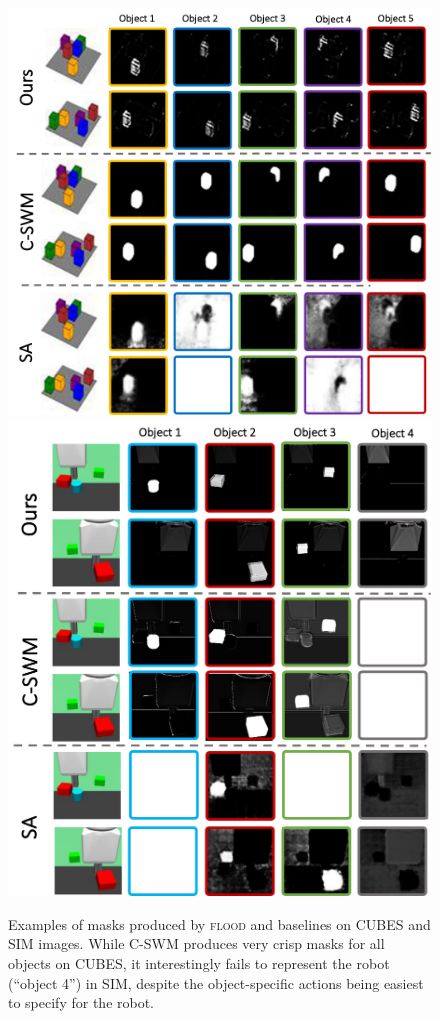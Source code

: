 \documentclass{article}
\begin{document}
\begin{figure}
  \centering
  \includegraphics[height=0.3\textheight]{figs/qual_cubes.pdf}
  \includegraphics[height=0.3\textheight]{figs/qual_sim.pdf}
  \caption{Examples of masks produced by \textsc{flood} and baselines on CUBES and SIM images. While C-SWM produces very crisp masks for all objects on CUBES, it interestingly fails to represent the robot (``object 4'') in SIM, despite the object-specific actions being easiest to specify for the robot. }
  \label{fig:qual_sim}
\end{figure}
\end{document}
